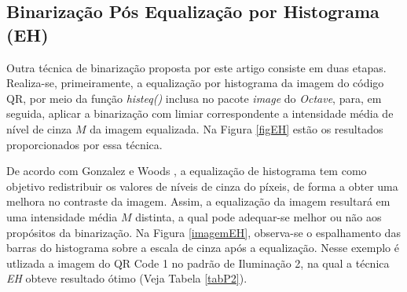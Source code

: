 \documentclass{ceel}
\begin{document}
\begin{multicols}{2}
\begin{minipage}[h]{\columnwidth}
 \hfill 
{}
\vspace{-0.1cm}
\caption{Imagens resultantes da Binarização com Limiar Fixo para o QR Code 3 nos padrões de (a) Iluminação 1, (c) Iluminação 2 e (e) Iluminação 3, com suas respectivas imagens diferença em (b), (d) e (f).} \label{figLF}
\end{minipage}

\subsection{Binarização Pós Equalização por Histograma (EH)} \label{Bhist}
Outra técnica de binarização proposta por este artigo consiste em duas etapas. Realiza-se, primeiramente, a equalização por histograma da imagem do código QR, por meio da função \emph{histeq()} inclusa no pacote \emph{image} do \emph{Octave}, para, em seguida, aplicar a binarização com limiar correspondente a intensidade média de nível de cinza  $M$ da imagem equalizada. Na Figura \ref{figEH} estão os resultados proporcionados por essa técnica.

De acordo com Gonzalez e Woods \cite{gonzales}, a equalização de histograma tem como objetivo redistribuir os valores de níveis de cinza do píxeis, de forma a obter uma melhora no contraste da imagem. Assim, a equalização da imagem resultará em uma intensidade média $M$ distinta, a qual pode adequar-se melhor ou não aos propósitos da binarização. Na Figura \ref{imagemEH}, observa-se o espalhamento das barras do histograma sobre a escala de cinza após a equalização. Nesse exemplo é utlizada a imagem do QR Code 1 no padrão de Iluminação 2, na qual a técnica \emph{EH} obteve resultado ótimo (Veja Tabela \ref{tabP2}).



\end{multicols}
\end{document}
